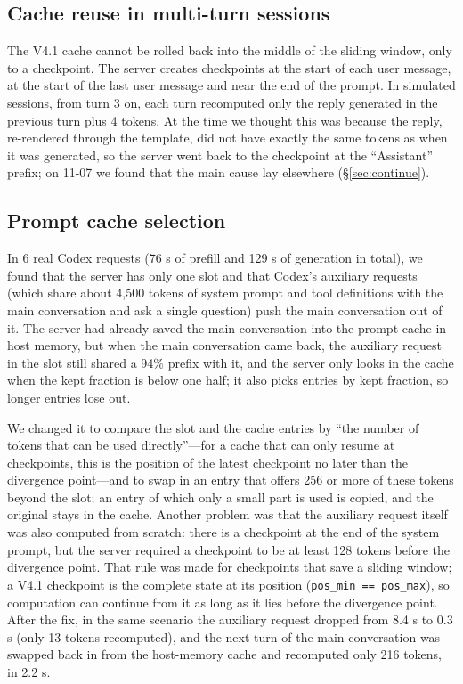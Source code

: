 \documentclass[11pt,a4paper]{article}
\newcommand{\code}[1]{\texttt{#1}}
\begin{document}
\subsection{Cache reuse in multi-turn sessions}

The V4.1 cache cannot be rolled back into the middle of the sliding window, only to a checkpoint. The server creates checkpoints at the start of each user message, at the start of the last user message and near the end of the prompt. In simulated sessions, from turn 3 on, each turn recomputed only the reply generated in the previous turn plus 4 tokens. At the time we thought this was because the reply, re-rendered through the template, did not have exactly the same tokens as when it was generated, so the server went back to the checkpoint at the ``Assistant'' prefix; on 11-07 we found that the main cause lay elsewhere (\S\ref{sec:continue}).

\subsection{Prompt cache selection}
\label{sec:promptcache}

In 6 real Codex requests (76 s of prefill and 129 s of generation in total), we found that the server has only one slot and that Codex's auxiliary requests (which share about 4,500 tokens of system prompt and tool definitions with the main conversation and ask a single question) push the main conversation out of it. The server had already saved the main conversation into the prompt cache in host memory, but when the main conversation came back, the auxiliary request in the slot still shared a 94\% prefix with it, and the server only looks in the cache when the kept fraction is below one half; it also picks entries by kept fraction, so longer entries lose out.

We changed it to compare the slot and the cache entries by ``the number of tokens that can be used directly''---for a cache that can only resume at checkpoints, this is the position of the latest checkpoint no later than the divergence point---and to swap in an entry that offers 256 or more of these tokens beyond the slot; an entry of which only a small part is used is copied, and the original stays in the cache. Another problem was that the auxiliary request itself was also computed from scratch: there is a checkpoint at the end of the system prompt, but the server required a checkpoint to be at least 128 tokens before the divergence point. That rule was made for checkpoints that save a sliding window; a V4.1 checkpoint is the complete state at its position (\code{pos\_min == pos\_max}), so computation can continue from it as long as it lies before the divergence point. After the fix, in the same scenario the auxiliary request dropped from 8.4 s to 0.3 s (only 13 tokens recomputed), and the next turn of the main conversation was swapped back in from the host-memory cache and recomputed only 216 tokens, in 2.2 s.
\end{document}
